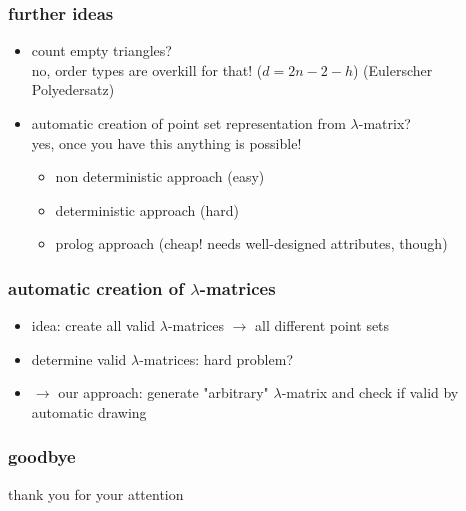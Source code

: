 \documentclass{beamer}
\begin{document}
\begin{frame}
\frametitle{further ideas}


\begin{itemize}
  \item count empty triangles?\\no, order types are overkill for that! ($d = 2n - 2 - h$) (Eulerscher Polyedersatz)
  \item automatic creation of point set representation from $\lambda$-matrix?\\ yes, once you have this anything is possible!
  \begin{itemize} 
    \item non deterministic approach (easy)
    \item deterministic approach (hard)
    \item prolog approach (cheap! needs well-designed attributes, though)
  \end{itemize}
  
\end{itemize}
\end{frame}
\begin{frame}
\frametitle{automatic creation of $\lambda$-matrices}

\begin{itemize} 
  \item idea: create all valid $\lambda$-matrices $\rightarrow$ all different point sets
  \item determine valid $\lambda$-matrices: hard problem?
  \item $\rightarrow$ our approach: generate "arbitrary" $\lambda$-matrix and check if valid by automatic drawing
\end{itemize}
  
\end{frame}
 
\begin{frame}
\frametitle{goodbye}

thank you for your attention
  
\end{frame}
\end{document}
